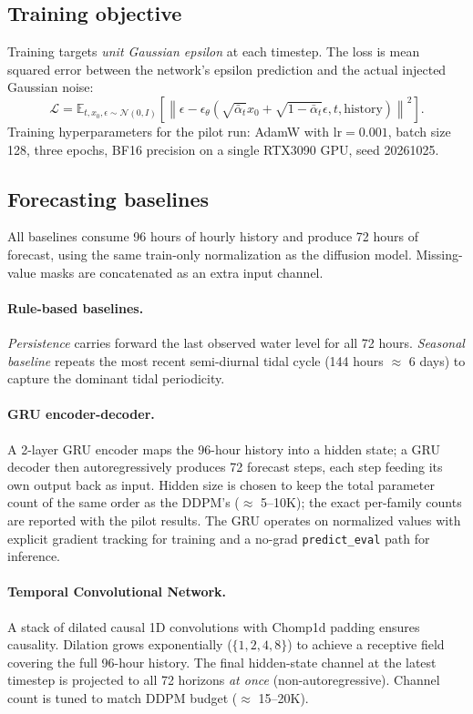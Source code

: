 \subsection{Training objective}
Training targets \emph{unit Gaussian epsilon} at each timestep. The loss is mean
squared error between the network's epsilon prediction and the actual injected
Gaussian noise:
\begin{equation}
    \mathcal{L} = \mathbb{E}_{t, x_0, \epsilon \sim \mathcal{N}(0,I)} \left[
        \left\| \epsilon - \epsilon_\theta(\sqrt{\bar{\alpha}_t} x_0 + \sqrt{1-\bar{\alpha}_t} \epsilon, t, \text{history}) \right\|^2
    \right].
\end{equation}
Training hyperparameters for the pilot run: AdamW with $\text{lr}=0.001$,
batch size 128, three epochs, BF16 precision on a single RTX3090 GPU, seed
20261025.

\subsection{Forecasting baselines}
All baselines consume 96 hours of hourly history and produce 72 hours of
forecast, using the same train-only normalization as the diffusion model.
Missing-value masks are concatenated as an extra input channel.

\paragraph{Rule-based baselines.}
\emph{Persistence} carries forward the last observed water level for all 72 hours.
\emph{Seasonal baseline} repeats the most recent semi-diurnal tidal cycle
(144 hours $\approx$ 6 days) to capture the dominant tidal periodicity.

\paragraph{GRU encoder-decoder.}
A 2-layer GRU encoder maps the 96-hour history into a hidden state; a GRU
decoder then autoregressively produces 72 forecast steps, each step feeding
its own output back as input. Hidden size is chosen to keep the
total parameter count of the same order as the DDPM's ($\approx$ 5--10K);
the exact per-family counts are reported with the pilot results. The GRU operates on normalized values with explicit
gradient tracking for training and a no-grad \texttt{predict\_eval} path for
inference.

\paragraph{Temporal Convolutional Network.}
A stack of dilated causal 1D convolutions with Chomp1d padding ensures causality.
Dilation grows exponentially ($\{1, 2, 4, 8\}$) to achieve a receptive field
covering the full 96-hour history. The final hidden-state channel at the
latest timestep is projected to all 72 horizons \emph{at once} (non-autoregressive).
Channel count is tuned to match DDPM budget ($\approx$ 15--20K).

